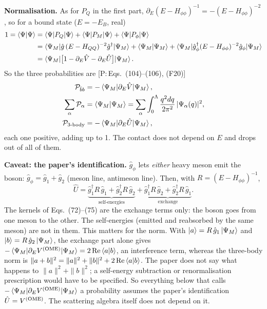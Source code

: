 \documentclass[11pt]{article}
\newcommand{\Pbb}{{\cal P}_{\bar bb}}
\newcommand{\tagP}[1]{\textcolor{blue!65!black}{\textsf{\small[P:\,#1]}}}
\newenvironment{aiadd}{\par}{\par}
\begin{document}
\begin{aiadd}
	\textbf{Normalisation.} As for $P_Q$ in the first part, $\partial_E(E-H_{\phi\phi})^{-1}=-(E-H_{\phi\phi})^{-2}$, so for a bound state ($E=-E_B$, real)
	\begin{align*}
		1=\braket{\Psi|\Psi} & =\braket{\Psi|P_Q|\Psi}+\braket{\Psi|P_M|\Psi}+\braket{\Psi|P_\phi|\Psi}                                                                                        \\
		                     & =\braket{\Psi_M|\hat g\,(E-H_{QQ})^{-2}\hat g^\dagger|\Psi_M}+\braket{\Psi_M|\Psi_M}+\braket{\Psi_M|\hat g_\phi^\dagger(E-H_{\phi\phi})^{-2}\hat g_\phi|\Psi_M} \\
		                     & =\braket{\Psi_M|\big[1-\partial_E\hat V-\partial_E\hat U\big]|\Psi_M}.
	\end{align*}
	So the three probabilities are \tagP{Eqs.~(104)--(106), (F20)}
	\begin{align*}
		\Pbb                         & =-\braket{\Psi_M|\partial_E\hat V|\Psi_M},                                                 \\
		\sum_\alpha\mathcal P_\alpha & =\braket{\Psi_M|\Psi_M}=\sum_\alpha\int_0^\Lambda\frac{q^2dq}{2\pi^2}\,|\Psi_\alpha(q)|^2, \\
		\mathcal P_{\text{3-body}}   & =-\braket{\Psi_M|\partial_E\hat U|\Psi_M},
	\end{align*}
	each one positive, adding up to 1. The contact does not depend on $E$ and drops out of all of them.

	\textbf{Caveat: the paper's identification.} $\hat g_\phi$ lets \emph{either} heavy meson emit the boson: $\hat g_\phi=\hat g_1+\hat g_2$ (meson line, antimeson line). Then, with $R=(E-H_{\phi\phi})^{-1}$,
	\[
		\hat U=\underbrace{\hat g_1^\dagger R\,\hat g_1+\hat g_2^\dagger R\,\hat g_2}_{\text{self-energies}}+\underbrace{\hat g_1^\dagger R\,\hat g_2+\hat g_2^\dagger R\,\hat g_1}_{\text{exchange}} .
	\]
	The kernels of Eqs.~(72)--(75) are the exchange terms only: the boson goes from one meson to the other. The self-energies (emitted and reabsorbed by the same meson) are not in them. This matters for the norm. With $\ket a=R\,\hat g_1\ket{\Psi_M}$ and $\ket b=R\,\hat g_2\ket{\Psi_M}$, the exchange part alone gives $-\braket{\Psi_M|\partial_EV^{\rm (OME)}|\Psi_M}=2\,\mathrm{Re}\braket{a|b}$, an interference term, whereas the three-body norm is $\|a+b\|^2=\|a\|^2+\|b\|^2+2\,\mathrm{Re}\braket{a|b}$. The paper does not say what happens to $\|a\|^2+\|b\|^2$; a self-energy subtraction or renormalisation prescription would have to be specified. So everything below that calls $-\braket{\Psi_M|\partial_EV^{\rm (OME)}|\Psi_M}$ a probability assumes the paper's identification $\hat U=V^{\rm (OME)}$. The scattering algebra itself does not depend on it.


\end{aiadd}
\end{document}
